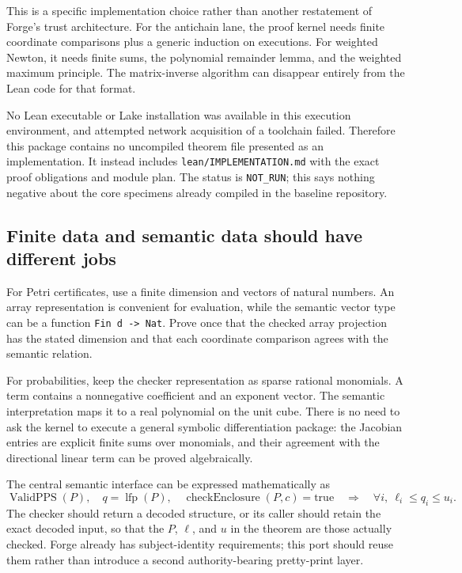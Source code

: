 \documentclass[11pt,a4paper]{article}
\theoremstyle{definition}\newtheorem{definition}[theorem]{Definition}
\theoremstyle{remark}\newtheorem{remark}[theorem]{Remark}
\newcommand{\lfp}{\operatorname{lfp}}\newcommand{\diag}{\operatorname{diag}}
\newcommand{\code}[1]{\nolinkurl{#1}}
\begin{document}
This is a specific implementation choice rather than another restatement of Forge's trust architecture. For the antichain lane, the proof kernel needs finite coordinate comparisons plus a generic induction on executions. For weighted Newton, it needs finite sums, the polynomial remainder lemma, and the weighted maximum principle. The matrix-inverse algorithm can disappear entirely from the Lean code for that format.

No Lean executable or Lake installation was available in this execution environment, and attempted network acquisition of a toolchain failed. Therefore this package contains no uncompiled theorem file presented as an implementation. It instead includes \code{lean/IMPLEMENTATION.md} with the exact proof obligations and module plan. The status is \code{NOT_RUN}; this says nothing negative about the core specimens already compiled in the baseline repository.

\subsection{Finite data and semantic data should have different jobs}
For Petri certificates, use a finite dimension and vectors of natural numbers. An array representation is convenient for evaluation, while the semantic vector type can be a function \code{Fin d -> Nat}. Prove once that the checked array projection has the stated dimension and that each coordinate comparison agrees with the semantic relation.

For probabilities, keep the checker representation as sparse rational monomials. A term contains a nonnegative coefficient and an exponent vector. The semantic interpretation maps it to a real polynomial on the unit cube. There is no need to ask the kernel to execute a general symbolic differentiation package: the Jacobian entries are explicit finite sums over monomials, and their agreement with the directional linear term can be proved algebraically.

The central semantic interface can be expressed mathematically as
\[
 \operatorname{ValidPPS}(P),\quad
 q=\lfp(P),\quad
 \operatorname{checkEnclosure}(P,c)=\mathrm{true}
 \quad\Longrightarrow\quad
 \forall i,\ \ell_i\le q_i\le u_i.
\]
The checker should return a decoded structure, or its caller should retain the exact decoded input, so that the $P$, $\ell$, and $u$ in the theorem are those actually checked. Forge already has subject-identity requirements; this port should reuse them rather than introduce a second authority-bearing pretty-print layer.
\end{document}
